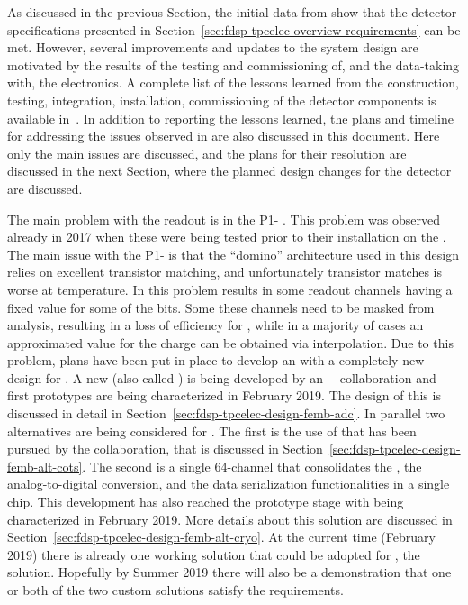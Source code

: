 As discussed in the previous Section, the initial data from 
show that the  detector specifications presented in 
Section~\ref{sec:fdsp-tpcelec-overview-requirements} can be met.
However, several improvements and updates to the  system design 
are motivated by the results of the testing and commissioning of, and 
the data-taking with, the  electronics. A complete list
of the lessons learned from the construction, testing, integration,
installation, commissioning of the  detector components
is available in~\cite{bib:docdb12367}. In addition to reporting the
lessons learned, the plans and timeline for addressing the issues 
observed in  are also discussed in this document. Here
only the main issues are discussed, and the plans for their resolution
are discussed in the next Section, where the planned design changes
for the  detector are discussed.

The main problem with the   readout is in the
P1- . This problem was observed already in 2017
when these  were being tested prior to their installation
on the . The main issue with the P1- is 
that the ``domino'' architecture used in this design relies on
excellent transistor matching, and unfortunately transistor matches
is worse at  temperature. In  this problem
results in some readout channels having a fixed value for some of
the  bits. Some these channels need to be masked 
from analysis, resulting in a loss of efficiency for , while
in a majority of cases an approximated value for the charge can
be obtained via interpolation. Due to this problem, plans have
been put in place to develop an  with a completely new
design for . A new   (also called 
 ) is being developed by an 
-- collaboration and first
prototypes are being characterized in February 2019. The design
of this  is discussed in detail in 
Section~\ref{sec:fdsp-tpcelec-design-femb-adc}. In parallel two
alternatives are being considered for . The first is the
use of   that has been pursued by the 
 collaboration, that is discussed in 
Section~\ref{sec:fdsp-tpcelec-design-femb-alt-cots}. The second is
a single \num{64}-channel  that consolidates
the , the analog-to-digital conversion, and the
data serialization functionalities in a single chip. This 
development has also reached the prototype stage with 
being characterized in February 2019. More details about this
solution are discussed in Section~\ref{sec:fdsp-tpcelec-design-femb-alt-cryo}.
At the current time (February 2019) there is already one working
solution that could be adopted for , the 
solution. Hopefully by Summer 2019 there will also be a demonstration
that one or both of the two custom  solutions satisfy
the  requirements.


